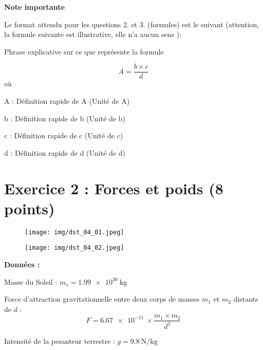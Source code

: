 \documentclass[answers]{exam}
\begin{document}
\textbf{Note importante} \\
\vspace{1em}

Le format attendu pour les questions 2. et 3. (formules) est le suivant (attention, la formule suivante est illustrative, elle n'a aucun sens ): 

\begin{tcolorbox}[colback=gray!10!white, colframe=gray, title=Attendu sur les formules]
  Phrase explicative sur ce que représente la formule

\[
  A = \frac{b \times c}{d}
  \]
  où 

  \begin{addmargin}[4em]{1em}
    \begin{compactitem}
        \item [A]: Définition rapide de A (Unité de A)
        \item [b]: Définition rapide de b (Unité de b)
        \item [c]: Définition rapide de c (Unité de c)
        \item [d]: Définition rapide de d (Unité de d)
    \end{compactitem}
    \end{addmargin}
  \end{tcolorbox}

\section*{Exercice 2 : Forces et poids (8 points)}

\begin{figure}[H]
  \centering
  \texttt{[image: img/dst\_04\_01.jpeg]}
  \captionsetup{labelformat=empty}
\end{figure}

\begin{figure}[H]
  \centering
  \texttt{[image: img/dst\_04\_02.jpeg]}
  \captionsetup{labelformat=empty}
\end{figure}

\textbf{Données :}
\begin{compactitem}
  \item Masse du Soleil : \( m_s = \SI{1.99e30}{\kilogram} \)
  \item Force d'attraction gravitationnelle entre deux corps de masses \( m_1 \) et \( m_2 \) distants de \( d \) :
  \[
  F = \SI{6.67e-11}{} \times \frac{m_1 \times m_2}{d^2}
  \]
  \item Intensité de la pesanteur terrestre : \( g = \SI{9.8}{\newton\per\kilogram} \)
\end{compactitem}
\end{document}

